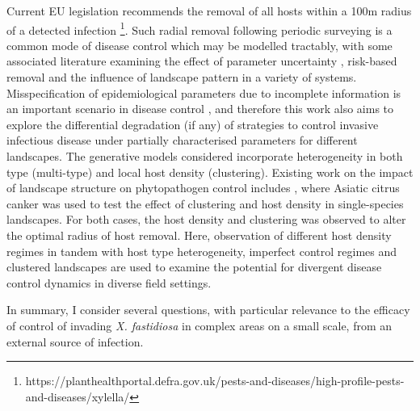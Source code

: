 \documentclass[11pt,letterpaper]{article}
\begin{document}
Current EU legislation recommends the removal of all hosts within a 100m radius of a detected infection \footnote{https://planthealthportal.defra.gov.uk/pests-and-diseases/high-profile-pests-and-diseases/xylella/}. Such radial removal following periodic surveying is a common mode of disease control which may be modelled tractably, with some associated literature examining the effect of parameter uncertainty \cite{Cunniffe2015}, risk-based removal \cite{HyattTwynam2017} and the influence of landscape pattern \cite{Parnell2009} \cite{Parnell2010} in a variety of systems. Misspecification of epidemiological parameters due to incomplete information is an important scenario in disease control \cite{Cunniffe2015} \cite{HyattTwynam2017}, and therefore this work also aims to explore the differential degradation (if any) of strategies to control invasive infectious disease under partially characterised parameters for different landscapes. The generative models considered incorporate heterogeneity in both type (multi-type) and local host density (clustering). Existing work on the impact of landscape structure on phytopathogen control includes \cite{Parnell2009} \cite{Parnell2010}, where Asiatic citrus canker was used to test the effect of clustering and host density in single-species landscapes. For both cases, the host density and clustering was observed to alter the optimal radius of host removal. Here, observation of different host density regimes in tandem with host type heterogeneity, imperfect control regimes and clustered landscapes are used to examine the potential for divergent disease control dynamics in diverse field settings. 

In summary, I consider several questions, with particular relevance to the efficacy of control of invading \emph{X. fastidiosa} in complex areas on a small scale, from an external source of infection. 
\end{document}
